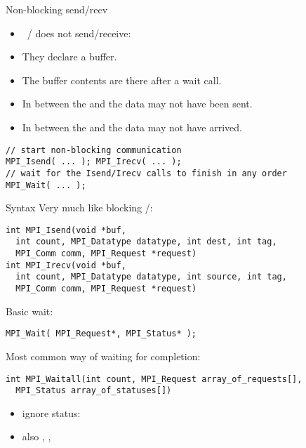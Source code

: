 \begin{numberedframe}{Non-blocking send/recv}
  \begin{itemize}
  \item {}~/  does not send/receive:
  \item They declare a buffer.
  \item The buffer contents are there after a wait call.
  \item In between the  and 
    the data may not have been sent.
  \item In between the  and 
    the data may not have arrived.
  \end{itemize}
\lstset{language=C}
\begin{lstlisting}
// start non-blocking communication
MPI_Isend( ... ); MPI_Irecv( ... );
// wait for the Isend/Irecv calls to finish in any order
MPI_Wait( ... );  
\end{lstlisting}
\end{numberedframe}

\begin{numberedframe}{Syntax}
  \small
  Very much like blocking /:
\lstset{language=C}
\begin{lstlisting}
int MPI_Isend(void *buf,
  int count, MPI_Datatype datatype, int dest, int tag,
  MPI_Comm comm, MPI_Request *request)
int MPI_Irecv(void *buf,
  int count, MPI_Datatype datatype, int source, int tag,
  MPI_Comm comm, MPI_Request *request)  
\end{lstlisting}

Basic wait:
\begin{lstlisting}
MPI_Wait( MPI_Request*, MPI_Status* );
\end{lstlisting}

Most common way of waiting for completion:
\begin{lstlisting}
int MPI_Waitall(int count, MPI_Request array_of_requests[], 
  MPI_Status array_of_statuses[])
\end{lstlisting}
\begin{itemize}
\item ignore status: 
\item also , , 
\end{itemize}
\end{numberedframe}

